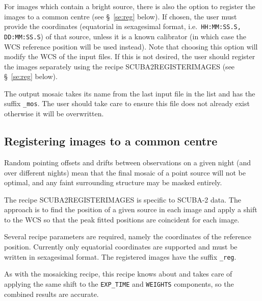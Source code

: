 \documentclass[twoside,11pt]{article}
\renewcommand{\_}{\texttt{\symbol{95}}}
\newcommand{\task}[1]{\textsf{#1}}
\begin{document}
For images which contain a bright source, there is also the option to
register the images to a common centre (see \S\ \ref{se:reg}
below). If chosen, the user must provide the coordinates (equatorial
in sexagesimal format, i.e.\ \verb+HH:MM:SS.S, DD:MM:SS.S+) of that
source, unless it is a known calibrator (in which case the WCS
reference position will be used instead). Note that choosing this
option will modify the WCS of the input files. If this is not desired,
the user should register the images separately using the recipe
\task{SCUBA2\_REGISTER\_IMAGES} (see \S\ \ref{se:reg} below).

The output mosaic takes its name from the last input file in the list
and has the suffix \verb+_mos+. The user should take care to ensure
this file does not already exist otherwise it will be overwritten.

\subsection{Registering images to a common centre\label{se:reg}}

Random pointing offsets and drifts between observations on a given
night (and over different nights) mean that the final mosaic of a
point source will not be optimal, and any faint surrounding structure
may be masked entirely.

The recipe \task{SCUBA2\_REGISTER\_IMAGES} is specific to SCUBA-2
data.  The approach is to find the position of a given source in each
image and apply a shift to the WCS so that the peak fitted positions
are coincident for each image.

Several recipe parameters are required, namely the coordinates of the
reference position. Currently only equatorial coordinates are
supported and must be written in sexagesimal format. The registered
images have the suffix \verb+_reg+.

As with the mosaicking recipe, this recipe knows about and takes care
of applying the same shift to the \verb+EXP_TIME+ and \verb+WEIGHTS+
components, so the combined results are accurate.
\end{document}
